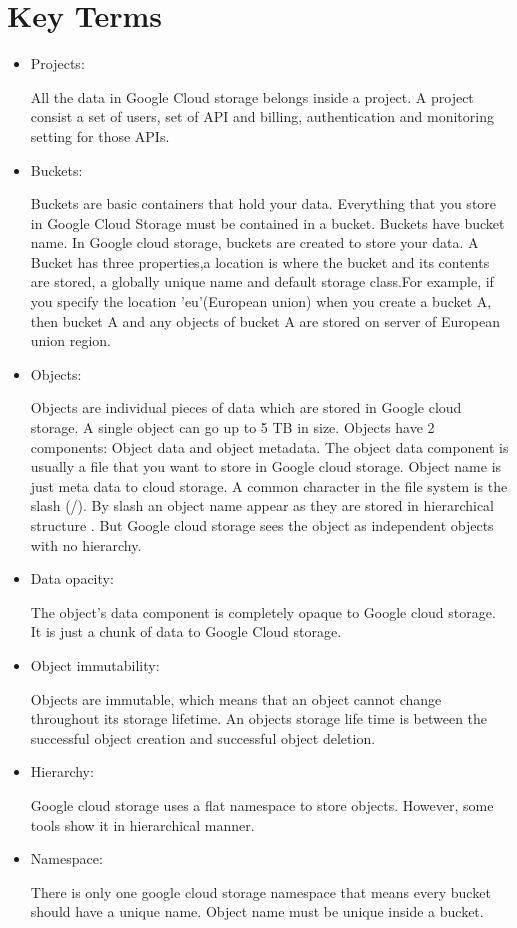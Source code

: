 \documentclass[9pt,twocolumn,twoside]{../../styles/osajnl}
\begin{document}
\section{Key Terms}
\begin{itemize}


\item Projects: 

All the data in Google Cloud storage belongs inside a project. A project consist a set of users, set of API and billing, authentication and monitoring setting for those APIs.\cite{www-google-cloud-storage} 


\item Buckets:

Buckets are basic containers that hold your data. Everything that you store in Google Cloud Storage must be contained in a bucket. Buckets have bucket name. In Google cloud storage, buckets are created to store your data. A Bucket has three properties,a location is where the bucket and its contents are stored, a globally unique name and default storage class.For example, if you specify the location 'eu'(European union)  when you create a bucket A, then bucket A and any objects of bucket A are stored on server of European union region. 


\item Objects:

Objects are individual pieces of data which are stored in Google cloud storage. A single object can go up to 5 TB in size. Objects have 2 components: Object data and object metadata. The object data component is usually a file that you want to store in Google cloud storage.
Object name is just meta data to cloud storage. A common character in the file system is the slash (/). By slash an object name appear as they are stored in hierarchical structure . But Google cloud storage sees the object as independent objects with no hierarchy.
 

\item Data opacity: 

The object’s data component is completely opaque to Google cloud storage. It is just a chunk of data to Google Cloud storage.

\item Object immutability: 

Objects are immutable, which means that an object cannot change throughout its storage lifetime. An objects storage life time is between the successful object creation and successful object deletion. 
 
\item Hierarchy:

Google cloud storage uses a flat namespace to store objects. However, some tools show it in hierarchical manner.
 
\item Namespace:

There is only one google cloud storage namespace that means every bucket should have a unique name. Object name must be unique inside a bucket.

\end{itemize}
\end{document}

